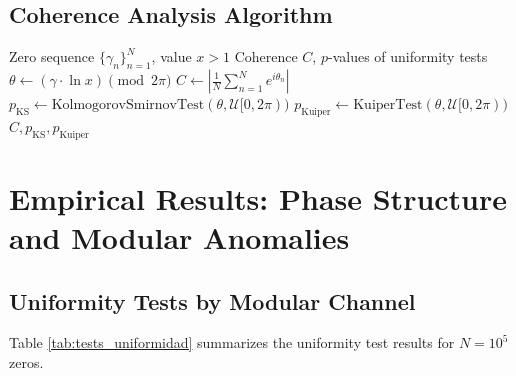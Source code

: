 \documentclass[12pt, a4paper]{article}
\theoremstyle{plain}
\theoremstyle{definition}
\theoremstyle{remark}
\begin{document}
\subsection{Coherence Analysis Algorithm}
\label{subsec:algoritmo_coherencia}

\begin{algorithm}[H]
\caption{Phase Coherence Analysis and Uniformity Tests}
\label{alg:fases_coherencia}
\begin{algorithmic}[1]
\Require Zero sequence $\{\gamma_n\}_{n=1}^N$, value $x > 1$
\Ensure Coherence $C$, $p$-values of uniformity tests
    \State $\theta \gets (\gamma \cdot \ln x) \pmod{2\pi}$ 
    \State $C \gets \left|\frac{1}{N} \sum_{n=1}^N e^{i\theta_n}\right|$ 
    \State $p_{\text{KS}} \gets \text{KolmogorovSmirnovTest}(\theta, \mathcal{U}[0, 2\pi))$
    \State $p_{\text{Kuiper}} \gets \text{KuiperTest}(\theta, \mathcal{U}[0, 2\pi))$
    \State \Return $C, p_{\text{KS}}, p_{\text{Kuiper}}$
\EndFunction
\end{algorithmic}
\end{algorithm}

\section{Empirical Results: Phase Structure and Modular Anomalies}
\label{sec:resultados}

\subsection{Uniformity Tests by Modular Channel}
\label{subsec:tests_uniformidad}

Table \ref{tab:tests_uniformidad} summarizes the uniformity test results for $N=10^5$ zeros.
\end{document}

